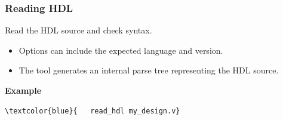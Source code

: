 \documentclass[t, notes, xcolor=table]{beamer}
\begin{document}
\begin{frame}[fragile]
\frametitle{Reading HDL}
\footnotesize{
Read the HDL source and check syntax.
\begin{itemize}
\item Options can include the expected language and version.
\item The tool generates an internal parse tree representing the HDL source.
\end{itemize}
\vspace{6pt}
\textbf{Example}
\begin{Verbatim}[commandchars=\\\{\}, tabsize=2]
\textcolor{blue}{	read_hdl my_design.v}
\end{Verbatim}
}

\end{frame}
\end{document}
